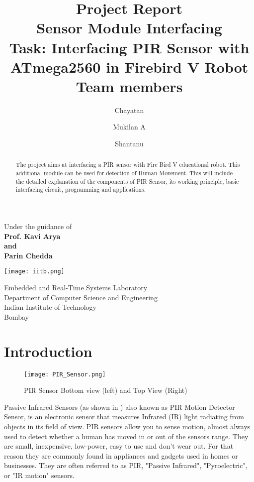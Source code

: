 \documentclass[a4paper,12 pt]{article}
\title {Project Report \\ Sensor Module Interfacing \\[10pt] Task:
Interfacing PIR Sensor with ATmega2560 in Firebird V Robot \\[25pt] Team members }
\author {Chayatan \and Mukilan A \and Shantanu}
\begin{document}
\maketitle
\begin{center}
\begin{large}
Under the guidance of\\
\textbf{Prof. Kavi Arya\\and\\Parin Chedda}\\
\vspace{0.5in}
\end{large}
\end{center}
\begin{center}
\texttt{[image: iitb.png]}
\end{center}
\begin{center}
\begin{large}
Embedded and Real-Time Systems Laboratory \\
Department of Computer Science and Engineering \\
Indian Institute of Technology \\
Bombay \\
\end{large}
\end{center}

\newpage
\tableofcontents
\newpage

\begin{abstract}
The project aims at interfacing a PIR sensor with Fire Bird
V educational robot. This additional module can be used for detection
of Human Movement. This will
include the detailed explanation of the components of PIR Sensor, its working principle, basic interfacing circuit, programming and
applications.
\end{abstract}
\section{Introduction} 
\vspace {5 mm}
\begin{figure}[h]
\begin{center}
\texttt{[image: PIR\_Sensor.png]}
\caption{PIR Sensor Bottom view (left) and Top View (Right)}
\label{fig:1}
\end{center}
\end{figure}
\vspace{-20 pt}
 Passive Infrared Sensors (as shown in ) also known as PIR Motion Detector Sensor, is an electronic sensor that measures Infrared (IR) light radiating from objects in its field of view. PIR sensors allow you to sense motion, almost always used to detect whether a human has moved in or out of the sensors range. They are small, inexpensive, low-power, easy to use and don't wear out. For that reason they are commonly found in appliances and gadgets used in homes or businesses. They are often referred to as PIR, "Passive Infrared", "Pyroelectric", or "IR motion" sensors.
\end{document}
